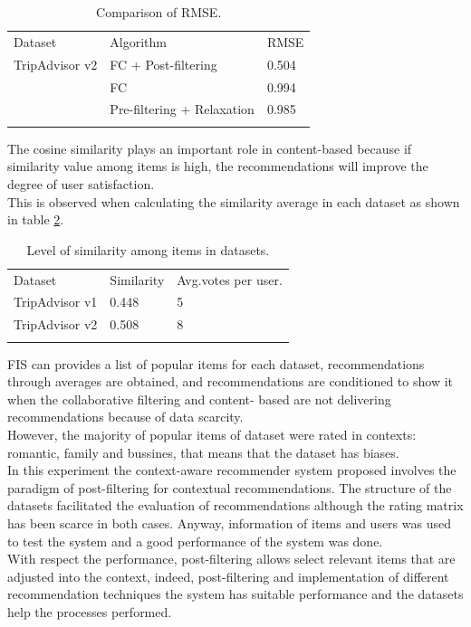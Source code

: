 \begin{table}
\centering
\small
\captionsetup{font=footnotesize}
\caption{Comparison of RMSE.}
\label{tab:4}  
\small   
\begin{tabular}{lll}
\hline\noalign{\smallskip}
Dataset & Algorithm & RMSE \\
\noalign{\smallskip}\hline\noalign{\smallskip}
TripAdvisor v2 & FC + Post-filtering  & 0.504  \\
               & FC          & 0.994  \\
               & Pre-filtering + Relaxation & 0.985  \\
\noalign{\smallskip}\hline
\end{tabular}
\end{table}
The cosine similarity plays an important role in content-based because
if similarity value among items is high, the recommendations will
improve the degree of user satisfaction. \\ This is observed when
calculating the similarity average in each dataset as shown in table
\ref{tab:5}.
\begin{table}
\centering
\small
\captionsetup{font=footnotesize}
\caption{Level of similarity among items in datasets. }
\label{tab:5}      
\begin{tabular}{lll}
\hline\noalign{\smallskip}
Dataset  & Similarity  & Avg.votes per user. \\
\noalign{\smallskip}\hline\noalign{\smallskip}
TripAdvisor v1 & 0.448  & 5  \\
TripAdvisor v2 & 0.508  & 8  \\
\noalign{\smallskip}\hline
\end{tabular}
\end{table}
FIS can provides a list of popular items for each dataset,
recommendations through averages are obtained, and recommendations are
conditioned to show it when the collaborative filtering and content-
based are not delivering recommendations because of data scarcity.\\ 
However, the majority of popular items of dataset were rated in contexts: romantic, family and bussines, that means that the dataset has
biases.\\  In this experiment  the context-aware recommender system
proposed involves the paradigm of post-filtering for contextual
recommendations. The structure of the datasets facilitated the
evaluation of recommendations although the rating matrix has been
scarce in both cases. Anyway, information of items and users was used
to test the system and a good performance of the system was done.\\   
With respect the performance, post-filtering allows select relevant
items that are adjusted into the context, indeed, post-filtering and
implementation of different recommendation techniques the system has
suitable performance and the datasets help the processes performed.

